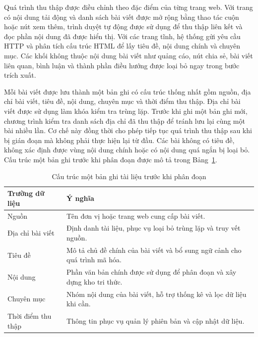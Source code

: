 \documentclass[a4paper,13pt,twoside]{report}
\begin{document}
Quá trình thu thập được điều chỉnh theo đặc điểm của từng trang web. Với trang có nội dung tải động và danh sách bài viết được mở rộng bằng thao tác cuộn hoặc nút xem thêm, trình duyệt tự động được sử dụng để thu thập liên kết và đọc phần nội dung đã được hiển thị. Với các trang tĩnh, hệ thống gửi yêu cầu HTTP và phân tích cấu trúc HTML để lấy tiêu đề, nội dung chính và chuyên mục. Các khối không thuộc nội dung bài viết như quảng cáo, nút chia sẻ, bài viết liên quan, bình luận và thành phần điều hướng được loại bỏ ngay trong bước trích xuất.

Mỗi bài viết được lưu thành một bản ghi có cấu trúc thống nhất gồm nguồn, địa chỉ bài viết, tiêu đề, nội dung, chuyên mục và thời điểm thu thập. Địa chỉ bài viết được sử dụng làm khóa kiểm tra trùng lặp. Trước khi ghi một bản ghi mới, chương trình kiểm tra danh sách địa chỉ đã thu thập để tránh lưu lại cùng một bài nhiều lần. Cơ chế này đồng thời cho phép tiếp tục quá trình thu thập sau khi bị gián đoạn mà không phải thực hiện lại từ đầu. Các bài không có tiêu đề, không xác định được vùng nội dung chính hoặc có nội dung quá ngắn bị loại bỏ. Cấu trúc một bản ghi trước khi phân đoạn được mô tả trong Bảng~\ref{tab:raw-document-schema}.

\begin{table}[H]
    \centering
    \begin{tabular}{|p{3.2cm}|p{10.2cm}|}
        \hline
        \textbf{Trường dữ liệu} & \textbf{Ý nghĩa}                                                          \\
        \hline
        Nguồn                   & Tên đơn vị hoặc trang web cung cấp bài viết.                              \\
        \hline
        Địa chỉ bài viết        & Định danh tài liệu, phục vụ loại bỏ trùng lặp và truy vết nguồn.          \\
        \hline
        Tiêu đề                 & Mô tả chủ đề chính của bài viết và bổ sung ngữ cảnh cho quá trình mã hóa. \\
        \hline
        Nội dung                & Phần văn bản chính được sử dụng để phân đoạn và xây dựng kho tri thức.    \\
        \hline
        Chuyên mục              & Nhóm nội dung của bài viết, hỗ trợ thống kê và lọc dữ liệu khi cần.       \\
        \hline
        Thời điểm thu thập      & Thông tin phục vụ quản lý phiên bản và cập nhật dữ liệu.                  \\
        \hline
    \end{tabular}
    \caption{Cấu trúc một bản ghi tài liệu trước khi phân đoạn}
    \label{tab:raw-document-schema}
\end{table}
\end{document}
